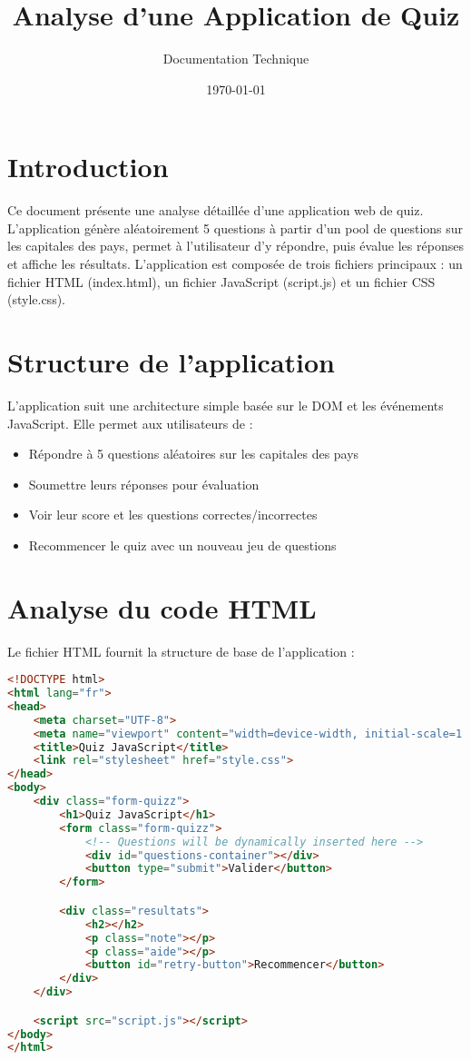 \documentclass{article}
\title{Analyse d'une Application de Quiz}
\author{Documentation Technique}
\date{\today}
\begin{document}
\maketitle

\section{Introduction}
Ce document présente une analyse détaillée d'une application web de quiz. L'application génère aléatoirement 5 questions à partir d'un pool de questions sur les capitales des pays, permet à l'utilisateur d'y répondre, puis évalue les réponses et affiche les résultats. L'application est composée de trois fichiers principaux : un fichier HTML (index.html), un fichier JavaScript (script.js) et un fichier CSS (style.css).

\section{Structure de l'application}
L'application suit une architecture simple basée sur le DOM et les événements JavaScript. Elle permet aux utilisateurs de :
\begin{itemize}
    \item Répondre à 5 questions aléatoires sur les capitales des pays
    \item Soumettre leurs réponses pour évaluation
    \item Voir leur score et les questions correctes/incorrectes
    \item Recommencer le quiz avec un nouveau jeu de questions
\end{itemize}

\section{Analyse du code HTML}
Le fichier HTML fournit la structure de base de l'application :

\begin{lstlisting}[language=HTML]
<!DOCTYPE html>
<html lang="fr">
<head>
    <meta charset="UTF-8">
    <meta name="viewport" content="width=device-width, initial-scale=1.0">
    <title>Quiz JavaScript</title>
    <link rel="stylesheet" href="style.css">
</head>
<body>
    <div class="form-quizz">
        <h1>Quiz JavaScript</h1>
        <form class="form-quizz">
            <!-- Questions will be dynamically inserted here -->
            <div id="questions-container"></div>
            <button type="submit">Valider</button>
        </form>

        <div class="resultats">
            <h2></h2>
            <p class="note"></p>
            <p class="aide"></p>
            <button id="retry-button">Recommencer</button>
        </div>
    </div>

    <script src="script.js"></script>
</body>
</html>
\end{lstlisting}
\end{document}

